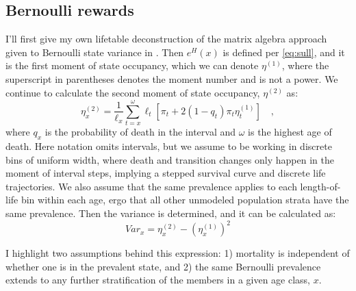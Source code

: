 \documentclass{bmcart}
\begin{document}

\subsection*{Bernoulli rewards}
I'll first give my own lifetable deconstruction of the matrix algebra approach given to Bernoulli state variance in \cite{caswell2018matrix}. Then $e^H(x)$ is defined per \eqref{eq:sull}, and it is the first moment of state occupancy, which we can denote $\eta^{(1)}$, where the superscript in parentheses denotes the moment number and is not a power. We continue to calculate the second moment of state occupancy, $\eta^{(2)}$ as:
\begin{equation}
\label{eq:bern2}
\eta^{(2)}_x = \frac{1}{\ell_x} \sum_{t=x}^\omega \ell_t\left[\pi_t + 2(1-q_t)\pi_t\eta^{(1)}_t\right] \quad \mathrm{,}
\end{equation}
where $q_x$ is the probability of death in the interval and $\omega$ is the highest age of death. Here notation omits intervals, but we assume to be working in discrete bins of uniform width, where death and transition changes only happen in the moment of interval steps, implying a stepped survival curve and discrete life trajectories. We also assume that the same prevalence applies to each length-of-life bin within each age, ergo that all other unmodeled population strata have the same prevalence. Then the variance is determined, and it can be calculated as:
\begin{equation}
\label{eq:var2}
Var_x = \eta^{(2)}_x - (\eta^{(1)}_x)^2
\end{equation}

I highlight two assumptions behind this expression: 1) mortality is independent of whether one is in the prevalent state, and 2) the same Bernoulli prevalence extends to any further stratification of the members in a given age class, $x$.
\end{document}
